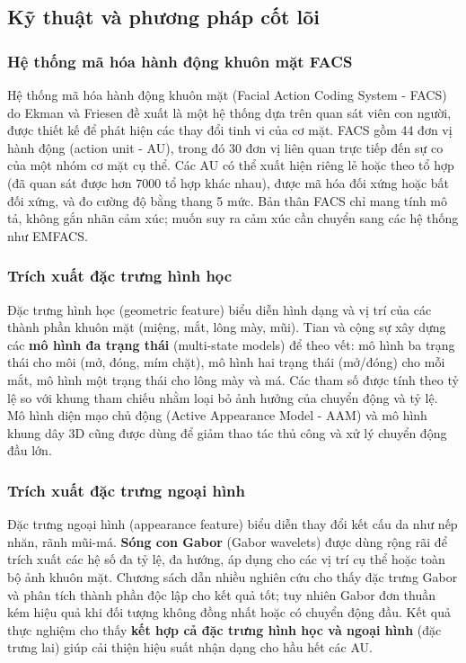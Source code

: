 \subsection{Kỹ thuật và phương pháp cốt lõi}

\subsubsection{Hệ thống mã hóa hành động khuôn mặt FACS}
Hệ thống mã hóa hành động khuôn mặt (Facial Action Coding System - FACS) do Ekman và Friesen đề xuất là một hệ thống dựa trên quan sát viên con người, được thiết kế để phát hiện các thay đổi tinh vi của cơ mặt. FACS gồm 44 đơn vị hành động (action unit - AU), trong đó 30 đơn vị liên quan trực tiếp đến sự co của một nhóm cơ mặt cụ thể. Các AU có thể xuất hiện riêng lẻ hoặc theo tổ hợp (đã quan sát được hơn 7000 tổ hợp khác nhau), được mã hóa đối xứng hoặc bất đối xứng, và đo cường độ bằng thang 5 mức. Bản thân FACS chỉ mang tính mô tả, không gắn nhãn cảm xúc; muốn suy ra cảm xúc cần chuyển sang các hệ thống như EMFACS.

\subsubsection{Trích xuất đặc trưng hình học}
Đặc trưng hình học (geometric feature) biểu diễn hình dạng và vị trí của các thành phần khuôn mặt (miệng, mắt, lông mày, mũi). Tian và cộng sự xây dựng các \textbf{mô hình đa trạng thái} (multi-state models) để theo vết: mô hình ba trạng thái cho môi (mở, đóng, mím chặt), mô hình hai trạng thái (mở/đóng) cho mỗi mắt, mô hình một trạng thái cho lông mày và má. Các tham số được tính theo tỷ lệ so với khung tham chiếu nhằm loại bỏ ảnh hưởng của chuyển động và tỷ lệ. Mô hình diện mạo chủ động (Active Appearance Model - AAM) và mô hình khung dây 3D cũng được dùng để giảm thao tác thủ công và xử lý chuyển động đầu lớn.

\subsubsection{Trích xuất đặc trưng ngoại hình}
Đặc trưng ngoại hình (appearance feature) biểu diễn thay đổi kết cấu da như nếp nhăn, rãnh mũi-má. \textbf{Sóng con Gabor} (Gabor wavelets) được dùng rộng rãi để trích xuất các hệ số đa tỷ lệ, đa hướng, áp dụng cho các vị trí cụ thể hoặc toàn bộ ảnh khuôn mặt. Chương sách dẫn nhiều nghiên cứu cho thấy đặc trưng Gabor và phân tích thành phần độc lập cho kết quả tốt; tuy nhiên Gabor đơn thuần kém hiệu quả khi đối tượng không đồng nhất hoặc có chuyển động đầu. Kết quả thực nghiệm cho thấy \textbf{kết hợp cả đặc trưng hình học và ngoại hình} (đặc trưng lai) giúp cải thiện hiệu suất nhận dạng cho hầu hết các AU.

